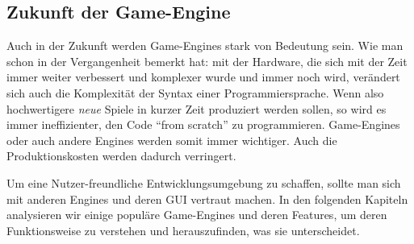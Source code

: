 \subsection{Zukunft der Game-Engine}

Auch in der Zukunft werden Game-Engines stark von Bedeutung sein. Wie man schon in der Vergangenheit bemerkt hat: mit der Hardware, die sich mit der Zeit immer weiter verbessert und komplexer wurde und immer noch wird, verändert sich auch die Komplexität der Syntax einer Programmiersprache.
Wenn also hochwertigere \textit{neue} Spiele in kurzer Zeit produziert werden sollen, so wird es immer ineffizienter, den Code "`from scratch"' zu programmieren. Game-Engines oder auch andere Engines  werden somit immer wichtiger. Auch die Produktionskosten werden dadurch verringert.

Um eine Nutzer-freundliche Entwicklungsumgebung zu schaffen, sollte man sich mit anderen Engines und deren GUI vertraut machen. In den folgenden Kapiteln analysieren wir einige populäre Game-Engines und deren Features, um deren Funktionsweise zu verstehen und herauszufinden, was sie unterscheidet.